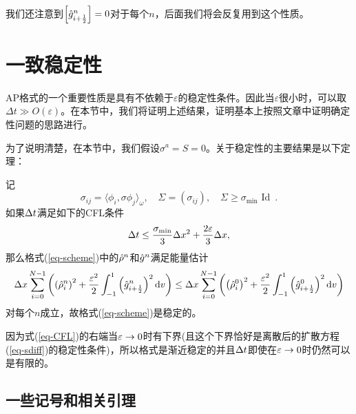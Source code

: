 我们还注意到$\left[ \hat{g}^n_{i+\frac{1}{2}} \right] = 0$对于每个$n$，后面我们将会反复用到这个性质。




\section{一致稳定性}
\label{sec:stab}
AP格式的一个重要性质是具有不依赖于$\varepsilon$的稳定性条件。因此当$\varepsilon$很小时，可以取$\Delta t \gg O(\varepsilon)$。在本节中，我们将证明上述结果，证明基本上按照文章中证明确定性问题的思路进行。

为了说明清楚，在本节中，我们假设$\sigma^a=S=0$。关于稳定性的主要结果是以下定理：
\begin{thm} \label{theo:stab} 记
$$
\sigma_{ij}= \langle \phi_i, \sigma \phi_j \rangle_\omega, \quad
\Sigma = ( \sigma_{ij}), \quad
\Sigma \ge \sigma_{\mathrm{min}} \mbox{ Id } \,.
$$
如果$\Delta t$满足如下的CFL条件
\begin{equation}  \label{eq-CFL}
\Delta t\leq  \frac{\sigma_{\mathrm{min}}}{3}\Delta x^2 + \frac{2 \varepsilon}{3}\Delta x,
\end{equation}
那么格式(\ref{eq-scheme})中的$\hat{\rho}^n$和$\hat{g}^n$满足能量估计
\begin{equation*}
\Delta x \sum_{i=0}^{N-1} \left(  \left(\hat{\rho}^n_{i}\right)^2 + \frac{\varepsilon^2}2 \int_{-1}^{1} \left(\hat{g}^n_{i+\frac{1}{2}}\right)^2\mathop{}\!\mathrm{d} v \right)
\leq
\Delta x \sum_{i=0}^{N-1}
\left(  \left(\hat \rho^0_i\right)^2 + \frac{\varepsilon^2}2 \int_{-1}^{1}\left(\hat g^0_{i+\frac{1}{2}}\right)^2 \mathop{}\!\mathrm{d} v \right)
\end{equation*}
对每个$n$成立，故格式(\ref{eq-scheme})是稳定的。
\end{thm}

\begin{rem}
因为式(\ref{eq-CFL})的右端当$\varepsilon \to 0$时有下界(且这个下界恰好是离散后的扩散方程(\ref{eq-sdiff})的稳定性条件)，所以格式是渐近稳定的并且$\Delta t$即使在$\varepsilon \to 0$时仍然可以是有限的。
\end{rem}


\subsection{一些记号和相关引理}
   \label{subsec:lemma}

